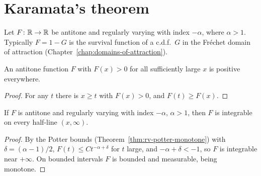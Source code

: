 \chapter{Karamata's theorem}

Let $F \colon \mathbb{R} \to \mathbb{R}$ be antitone and regularly varying with index $-\alpha$, where
$\alpha > 1$. Typically $F = 1 - G$ is the survival function of a c.d.f.\ $G$ in the
Fréchet domain of attraction (Chapter~\ref{chap:domains-of-attraction}).

\begin{lemma}
  \label{lem:pos-of-antitone}
  \leanok
  An antitone function $F$ with $F(x) > 0$ for all sufficiently large $x$ is positive everywhere.
\end{lemma}
\begin{proof}
  \leanok
  For any $t$ there is $x \ge t$ with $F(x) > 0$, and $F(t) \ge F(x)$.
\end{proof}

\begin{lemma}
  \label{lem:rv-integrableOn-Ioi}
  \leanok
  If $F$ is antitone and regularly varying with index $-\alpha$, $\alpha > 1$, then $F$ is
  integrable on every half-line $(x, \infty)$.
\end{lemma}
\begin{proof}
  \leanok
  By the Potter bounds (Theorem~\ref{thm:rv-potter-monotone}) with
  $\delta = (\alpha - 1)/2$, $F(t) \le C t^{-\alpha+\delta}$ for $t$ large, and
  $-\alpha + \delta < -1$, so $F$ is integrable near $+\infty$. On bounded intervals
  $F$ is bounded and measurable, being monotone.
\end{proof}

